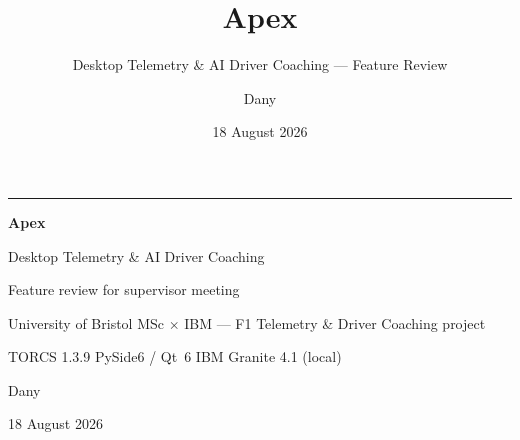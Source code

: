 \documentclass[aspectratio=169,10pt]{beamer}
\title{Apex}
\subtitle{Desktop Telemetry \& AI Driver Coaching --- Feature Review}
\author{Dany}
\institute{University of Bristol MSc $\times$ IBM --- F1 Telemetry \& Driver Coaching}
\date{18 August 2026}
\begin{document}
\begin{frame}[plain]
  \vspace{1.2em}
  {\color{cblue}\rule{\textwidth}{3pt}}\par\vspace{1.0em}
  {\Huge\bfseries Apex}\par\vspace{0.4em}
  {\large Desktop Telemetry \& AI Driver Coaching}\par\vspace{0.2em}
  {\large\color{cgray} Feature review for supervisor meeting}\par\vspace{1.6em}
  {\small\color{cgray}
   University of Bristol MSc $\times$ IBM --- F1 Telemetry \& Driver Coaching project\par
   \vspace{0.4em}
   TORCS 1.3.9 \quad\textbullet\quad PySide6 / Qt~6 \quad\textbullet\quad IBM Granite 4.1 (local)\par}
  \vspace{1.2em}
  {\small\color{cink} Dany\par}
  {\small\color{cgray} 18 August 2026\par}
  \vspace{0.6em}{\color{cline}\rule{\textwidth}{0.8pt}}
\end{frame}
\end{document}
